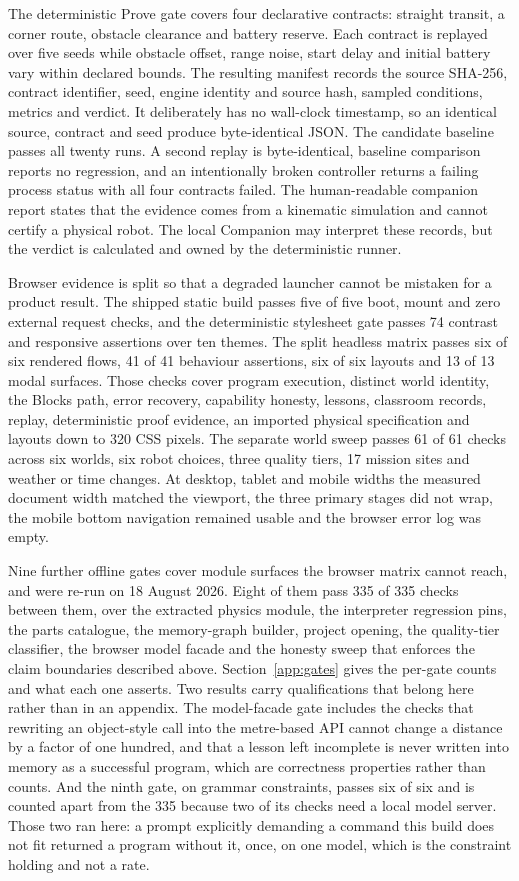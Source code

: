 \documentclass[11pt,a4paper]{report}
\begin{document}
The deterministic Prove gate covers four declarative contracts: straight transit, a corner route, obstacle clearance and battery reserve. Each contract is replayed over five seeds while obstacle offset, range noise, start delay and initial battery vary within declared bounds. The resulting manifest records the source SHA-256, contract identifier, seed, engine identity and source hash, sampled conditions, metrics and verdict. It deliberately has no wall-clock timestamp, so an identical source, contract and seed produce byte-identical JSON. The candidate baseline passes all twenty runs. A second replay is byte-identical, baseline comparison reports no regression, and an intentionally broken controller returns a failing process status with all four contracts failed. The human-readable companion report states that the evidence comes from a kinematic simulation and cannot certify a physical robot. The local Companion may interpret these records, but the verdict is calculated and owned by the deterministic runner.

Browser evidence is split so that a degraded launcher cannot be mistaken for a product result. The shipped static build passes five of five boot, mount and zero external request checks, and the deterministic stylesheet gate passes 74 contrast and responsive assertions over ten themes. The split headless matrix passes six of six rendered flows, 41 of 41 behaviour assertions, six of six layouts and 13 of 13 modal surfaces. Those checks cover program execution, distinct world identity, the Blocks path, error recovery, capability honesty, lessons, classroom records, replay, deterministic proof evidence, an imported physical specification and layouts down to 320 CSS pixels. The separate world sweep passes 61 of 61 checks across six worlds, six robot choices, three quality tiers, 17 mission sites and weather or time changes. At desktop, tablet and mobile widths the measured document width matched the viewport, the three primary stages did not wrap, the mobile bottom navigation remained usable and the browser error log was empty.

Nine further offline gates cover module surfaces the browser matrix cannot reach, and were re-run on 18 August 2026. Eight of them pass 335 of 335 checks between them, over the extracted physics module, the interpreter regression pins, the parts catalogue, the memory-graph builder, project opening, the quality-tier classifier, the browser model facade and the honesty sweep that enforces the claim boundaries described above. Section~\ref{app:gates} gives the per-gate counts and what each one asserts. Two results carry qualifications that belong here rather than in an appendix. The model-facade gate includes the checks that rewriting an object-style call into the metre-based API cannot change a distance by a factor of one hundred, and that a lesson left incomplete is never written into memory as a successful program, which are correctness properties rather than counts. And the ninth gate, on grammar constraints, passes six of six and is counted apart from the 335 because two of its checks need a local model server. Those two ran here: a prompt explicitly demanding a command this build does not fit returned a program without it, once, on one model, which is the constraint holding and not a rate.
\end{document}
